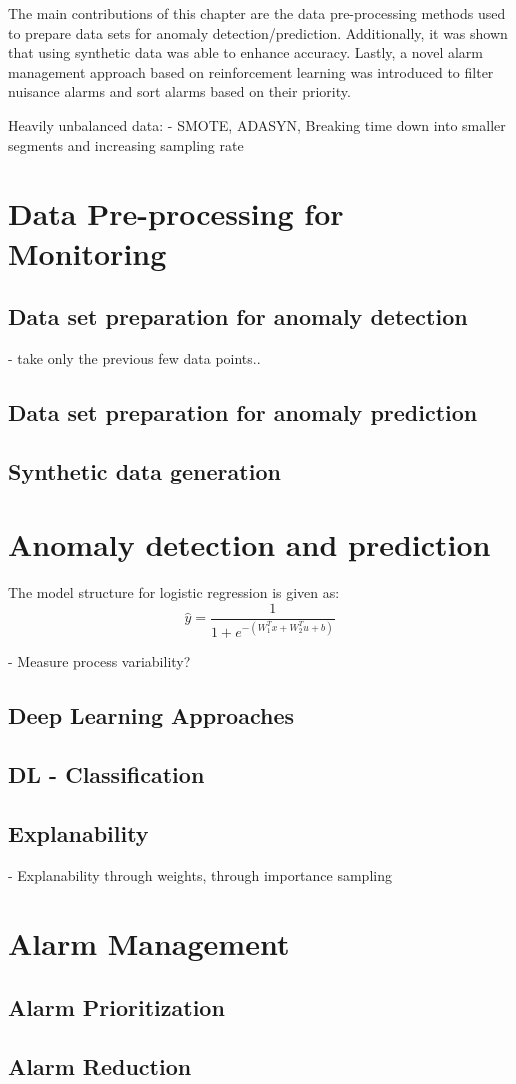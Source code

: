 The main contributions of this chapter are the data pre-processing methods used to prepare data sets for anomaly detection/prediction.  Additionally, it was shown that using synthetic data was able to enhance accuracy.  Lastly, a novel alarm management approach based on reinforcement learning was introduced to filter nuisance alarms and sort alarms based on their priority.  




Heavily unbalanced data:
- SMOTE, ADASYN, Breaking time down into smaller segments and increasing sampling rate

\section{Data Pre-processing for Monitoring}

\subsection{Data set preparation for anomaly detection}
- take only the previous few data points..

\subsection{Data set preparation for anomaly prediction}

\subsection{Synthetic data generation}


\section{Anomaly detection and prediction}
The model structure for logistic regression is given as:
\begin{equation}
    \hat{y} = \frac{1}{1 + e^{-(W_1^Tx + W_2^Tu + b)}}
    \label{eq:02LogS}
\end{equation}

- Measure process variability?

\subsection{Deep Learning Approaches}
\subsection{DL - Classification}

\subsection{Explanability}
- Explanability through weights, through importance sampling

\section{Alarm Management}

\subsection{Alarm Prioritization}

\subsection{Alarm Reduction}
